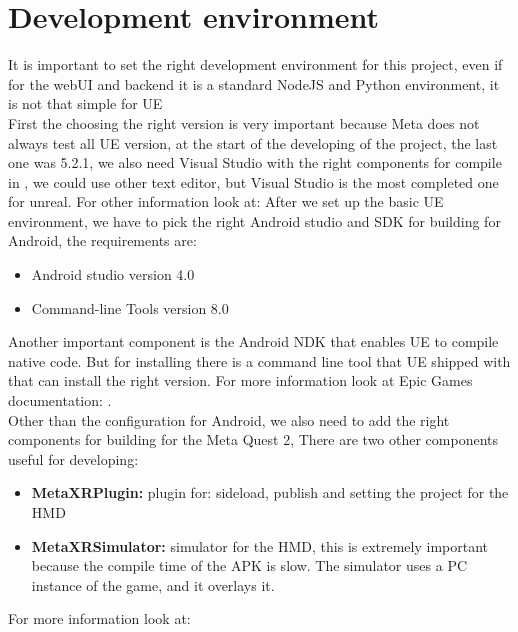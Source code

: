 \section{Development environment}
\noindent
It is important to set the right development environment for this project, even if for the webUI and backend it is a standard NodeJS and Python environment, 
it is not that simple for \ac{UE}\\
First the choosing the right version is very important because Meta does not always test all \ac{UE} version, at the start of the developing of the project, the last one was 5.2.1,
we also need Visual Studio with the right components for compile in \cpp, we could use other text editor, but Visual Studio is the most completed one for unreal.
For other information look at: \cite{UEvisualStudio}
After we set up the basic \ac{UE} environment, we have to pick the right Android studio and \ac{SDK} for building for Android, the requirements are:

\begin{itemize}
  \item Android studio version 4.0
  \item Command-line Tools version 8.0
\end{itemize}
\noindent
Another important component is the Android \ac{NDK} that enables \ac{UE} to compile native \cpp code.
But for installing there is a command line tool that \ac{UE} shipped with that can install the right version. 
For more information look at Epic Games documentation: \cite{UEandroid}.\\
Other than the configuration for Android, we also need to add the right components for building for the Meta Quest 2,
There are two other components useful for developing:
\begin{itemize}
  \item \textbf{MetaXRPlugin:} plugin for: sideload, publish and setting the project for the \ac{HMD}
  \item \textbf{MetaXRSimulator:} simulator for the \ac{HMD}, this is extremely important because the compile time of the \ac{APK} is slow. The simulator uses a PC instance of the game, and it overlays it.
\end{itemize}
\noindent
For more information look at: \cite{MetaSetup}